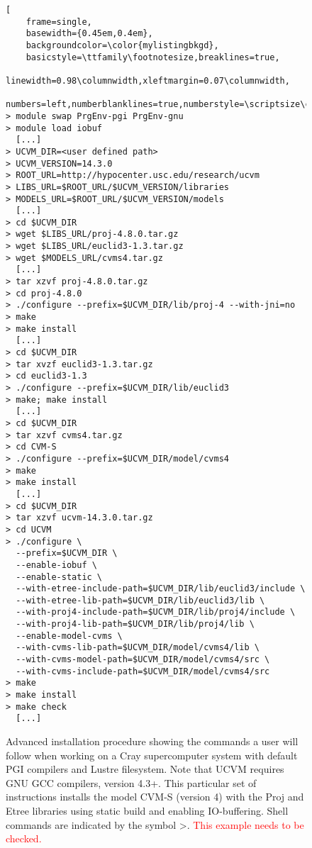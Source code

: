 
\begin{figure}[ht!]
\centering
\begin{lstlisting}[
	frame=single,
	basewidth={0.45em,0.4em},
	backgroundcolor=\color{mylistingbkgd},
	basicstyle=\ttfamily\footnotesize,breaklines=true,
	linewidth=0.98\columnwidth,xleftmargin=0.07\columnwidth,
	numbers=left,numberblanklines=true,numberstyle=\scriptsize\color{mylistingnclr}]
> module swap PrgEnv-pgi PrgEnv-gnu
> module load iobuf
  [...]
> UCVM_DIR=<user defined path>
> UCVM_VERSION=14.3.0
> ROOT_URL=http://hypocenter.usc.edu/research/ucvm
> LIBS_URL=$ROOT_URL/$UCVM_VERSION/libraries
> MODELS_URL=$ROOT_URL/$UCVM_VERSION/models
  [...]
> cd $UCVM_DIR
> wget $LIBS_URL/proj-4.8.0.tar.gz
> wget $LIBS_URL/euclid3-1.3.tar.gz
> wget $MODELS_URL/cvms4.tar.gz
  [...]
> tar xzvf proj-4.8.0.tar.gz
> cd proj-4.8.0
> ./configure --prefix=$UCVM_DIR/lib/proj-4 --with-jni=no
> make
> make install
  [...]
> cd $UCVM_DIR
> tar xvzf euclid3-1.3.tar.gz
> cd euclid3-1.3
> ./configure --prefix=$UCVM_DIR/lib/euclid3
> make; make install
  [...]
> cd $UCVM_DIR
> tar xzvf cvms4.tar.gz
> cd CVM-S
> ./configure --prefix=$UCVM_DIR/model/cvms4
> make
> make install
  [...]
> cd $UCVM_DIR
> tar xzvf ucvm-14.3.0.tar.gz
> cd UCVM
> ./configure \
  --prefix=$UCVM_DIR \
  --enable-iobuf \
  --enable-static \
  --with-etree-include-path=$UCVM_DIR/lib/euclid3/include \
  --with-etree-lib-path=$UCVM_DIR/lib/euclid3/lib \
  --with-proj4-include-path=$UCVM_DIR/lib/proj4/include \
  --with-proj4-lib-path=$UCVM_DIR/lib/proj4/lib \
  --enable-model-cvms \
  --with-cvms-lib-path=$UCVM_DIR/model/cvms4/lib \
  --with-cvms-model-path=$UCVM_DIR/model/cvms4/src \
  --with-cvms-include-path=$UCVM_DIR/model/cvms4/src
> make
> make install
> make check
  [...]
\end{lstlisting}
\caption{Advanced installation procedure showing the commands a user will follow when working on a Cray supercomputer system with default PGI compilers and Lustre filesystem. Note that UCVM requires GNU GCC compilers, version 4.3+. This particular set of instructions installs the model CVM-S (version 4) with the Proj and Etree libraries using static build and enabling IO-buffering. Shell commands are indicated by the symbol \textgreater. \textcolor{red}{This example needs to be checked.}}
\label{fig:instadvanced}
\end{figure}


